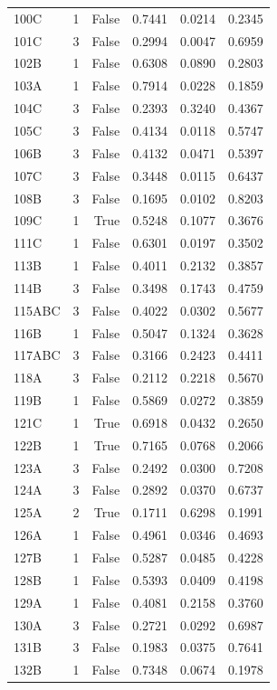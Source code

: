 \begin{longtable}{lrrrrr}
  100C & 1 & False & 0.7441 & 0.0214 & 0.2345 \\
  101C & 3 & False & 0.2994 & 0.0047 & 0.6959 \\
  102B & 1 & False & 0.6308 & 0.0890 & 0.2803 \\
  103A & 1 & False & 0.7914 & 0.0228 & 0.1859 \\
  104C & 3 & False & 0.2393 & 0.3240 & 0.4367 \\
  105C & 3 & False & 0.4134 & 0.0118 & 0.5747 \\
  106B & 3 & False & 0.4132 & 0.0471 & 0.5397 \\
  107C & 3 & False & 0.3448 & 0.0115 & 0.6437 \\
  108B & 3 & False & 0.1695 & 0.0102 & 0.8203 \\
  109C & 1 & True & 0.5248 & 0.1077 & 0.3676 \\
  111C  & 1 & False & 0.6301 & 0.0197 & 0.3502 \\
  113B & 1 & False & 0.4011 & 0.2132 & 0.3857 \\
  114B & 3 & False & 0.3498 & 0.1743 & 0.4759 \\
  115ABC & 3 & False & 0.4022 & 0.0302 & 0.5677 \\
  116B & 1 & False & 0.5047 & 0.1324 & 0.3628 \\
  117ABC & 3 & False & 0.3166 & 0.2423 & 0.4411 \\
  118A & 3 & False & 0.2112 & 0.2218 & 0.5670 \\
  119B & 1 & False & 0.5869 & 0.0272 & 0.3859 \\
  121C & 1 & True & 0.6918 & 0.0432 & 0.2650 \\
  122B & 1 & True & 0.7165 & 0.0768 & 0.2066 \\
  123A & 3 & False & 0.2492 & 0.0300 & 0.7208 \\
  124A & 3 & False & 0.2892 & 0.0370 & 0.6737 \\
  125A & 2 & True & 0.1711 & 0.6298 & 0.1991 \\
  126A & 1 & False & 0.4961 & 0.0346 & 0.4693 \\
  127B & 1 & False & 0.5287 & 0.0485 & 0.4228 \\
  128B & 1 & False & 0.5393 & 0.0409 & 0.4198 \\
  129A & 1 & False & 0.4081 & 0.2158 & 0.3760 \\
  130A & 3 & False & 0.2721 & 0.0292 & 0.6987 \\
  131B & 3 & False & 0.1983 & 0.0375 & 0.7641 \\
  132B & 1 & False & 0.7348 & 0.0674 & 0.1978 \\

\end{longtable}

